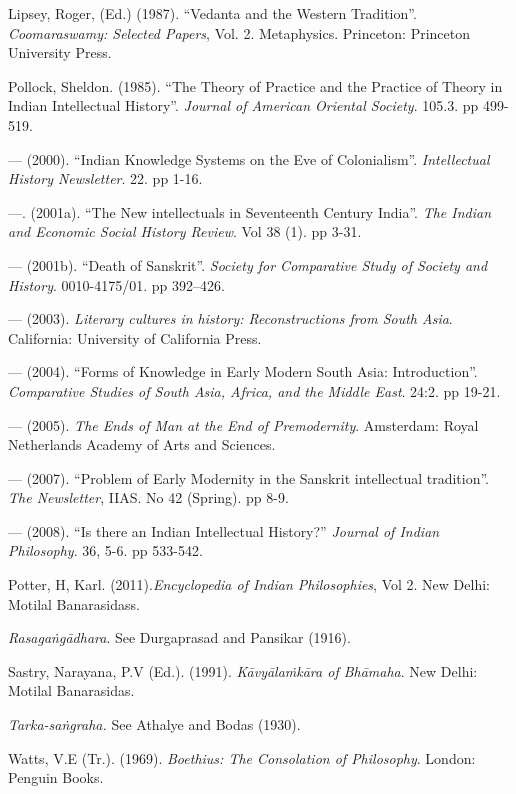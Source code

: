 \begin{thebibliography}{99}
 Lipsey, Roger, (Ed.) (1987). “Vedanta and the Western Tradition”. {\sl Coomaraswamy: Selected Papers}, Vol. 2. Metaphysics. Princeton: Princeton University Press. 

 Pollock, Sheldon. (1985). “The Theory of Practice and the Practice of Theory in Indian Intellectual History”. {\sl Journal of American Oriental Society}. 105.3. pp 499-519. 

 --- (2000). “Indian Knowledge Systems on the Eve of Colonialism”. {\sl Intellectual History Newsletter}. 22. pp 1-16.

 ---. (2001a). “The New intellectuals in Seventeenth Century India”. {\sl The Indian and Economic Social History Review}. Vol 38 (1). pp 3-31.

 --- (2001b). “Death of Sanskrit”. {\sl Society for Comparative Study of Society and History}. 0010-4175/01. pp 392–426. 

 --- (2003). {\sl Literary cultures in history: Reconstructions from South Asia}. California: University of California Press. 

 --- (2004). “Forms of Knowledge in Early Modern South Asia: Introduction”. {\sl Comparative Studies of South Asia, Africa, and the Middle East}. 24:2. pp 19-21.

 --- (2005). {\sl The Ends of Man at the End of Premodernity}. Amsterdam: Royal Netherlands Academy of Arts and Sciences. 

 --- (2007). “Problem of Early Modernity in the Sanskrit intellectual tradition”. {\sl The Newsletter}, IIAS. No 42 (Spring). pp 8-9. 

 --- (2008). “Is there an Indian Intellectual History?” {\sl Journal of Indian Philosophy}. 36, 5-6. pp 533-542.

 Potter, H, Karl. (2011).{\sl  Encyclopedia of Indian Philosophies}, Vol 2. New Delhi: Motilal Banarasidass. 

{\em Rasagaṅgādhara}. See Durgaprasad and Pansikar (1916).

 Sastry, Narayana, P.V (Ed.). (1991). {\sl Kāvyālaṁkāra of Bhāmaha}. New Delhi: Motilal Banarasidas. 

 {\sl Tarka-saṅgraha.} See Athalye and Bodas (1930).

 Watts, V.E (Tr.). (1969). {\sl Boethius: The Consolation of Philosophy}. London: Penguin Books. 
\end{thebibliography}

\theendnotes
\label{chapter\thechapter:end}
